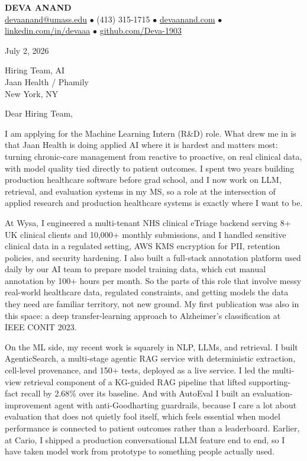 \documentclass[letterpaper,11pt]{article}
\begin{document}
\begin{center}
    {\fontsize{18}{20}\selectfont\bfseries DEVA ANAND}\\ \vspace{3pt}
    {\small
    \href{mailto:devaanand@umass.edu}{devaanand@umass.edu}
    \enspace$\bullet$\enspace
    (413) 315-1715
    \enspace$\bullet$\enspace
    \href{https://devaanand.com}{devaanand.com}
    \enspace$\bullet$\enspace
    \href{https://linkedin.com/in/devaaa/}{linkedin.com/in/devaaa}
    \enspace$\bullet$\enspace
    \href{https://github.com/Deva-1903}{github.com/Deva-1903}}
\end{center}

\vspace{6pt}

July 2, 2026

Hiring Team, AI \\
Jaan Health / Phamily \\
New York, NY

\vspace{2pt}

Dear Hiring Team,

I am applying for the Machine Learning Intern (R\&D) role. What drew me in is that Jaan Health is doing applied AI where it is hardest and matters most: turning chronic-care management from reactive to proactive, on real clinical data, with model quality tied directly to patient outcomes. I spent two years building production healthcare software before grad school, and I now work on LLM, retrieval, and evaluation systems in my MS, so a role at the intersection of applied research and production healthcare systems is exactly where I want to be.

At Wysa, I engineered a multi-tenant NHS clinical eTriage backend serving 8+ UK clinical clients and 10,000+ monthly submissions, and I handled sensitive clinical data in a regulated setting, AWS KMS encryption for PII, retention policies, and security hardening. I also built a full-stack annotation platform used daily by our AI team to prepare model training data, which cut manual annotation by 100+ hours per month. So the parts of this role that involve messy real-world healthcare data, regulated constraints, and getting models the data they need are familiar territory, not new ground. My first publication was also in this space: a deep transfer-learning approach to Alzheimer's classification at IEEE CONIT 2023.

On the ML side, my recent work is squarely in NLP, LLMs, and retrieval. I built AgenticSearch, a multi-stage agentic RAG service with deterministic extraction, cell-level provenance, and 150+ tests, deployed as a live service. I led the multi-view retrieval component of a KG-guided RAG pipeline that lifted supporting-fact recall by 2.68\% over its baseline. And with AutoEval I built an evaluation-improvement agent with anti-Goodharting guardrails, because I care a lot about evaluation that does not quietly fool itself, which feels essential when model performance is connected to patient outcomes rather than a leaderboard. Earlier, at Cario, I shipped a production conversational LLM feature end to end, so I have taken model work from prototype to something people actually used.
\end{document}
